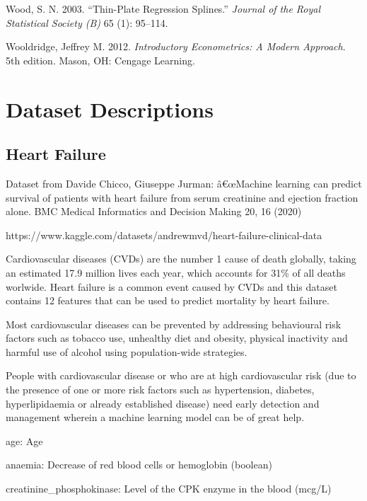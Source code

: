 \documentclass[
  letterpaper,
]{krantz}
\newlength{\cslhangindent}
\newlength{\cslentryspacingunit} %
\newenvironment{CSLReferences}[2] %
 {%
  \setlength{\parindent}{0pt}
  \ifodd #1
  \let\oldpar\par
  \def\par{\hangindent=\cslhangindent\oldpar}
  \fi
  \setlength{\parskip}{#2\cslentryspacingunit}
 }%
 {}
\begin{document}
\begin{CSLReferences}{1}{0}
\leavevmode{}%
Wood, S. N. 2003. {``Thin-Plate Regression Splines.''} \emph{Journal of
the Royal Statistical Society (B)} 65 (1): 95--114.

\leavevmode{}%
Wooldridge, Jeffrey M. 2012. \emph{Introductory {Econometrics}: {A}
{Modern} {Approach}}. 5th edition. Mason, OH: Cengage Learning.

\end{CSLReferences}

\chapter{Dataset Descriptions}\label{sec-data-descript}

\section{Heart Failure}\label{sec-dd-hear-failure}

Dataset from Davide Chicco, Giuseppe Jurman: â€œMachine learning can
predict survival of patients with heart failure from serum creatinine
and ejection fraction alone. BMC Medical Informatics and Decision Making
20, 16 (2020)

https://www.kaggle.com/datasets/andrewmvd/heart-failure-clinical-data

Cardiovascular diseases (CVDs) are the number 1 cause of death globally,
taking an estimated 17.9 million lives each year, which accounts for
31\% of all deaths worlwide. Heart failure is a common event caused by
CVDs and this dataset contains 12 features that can be used to predict
mortality by heart failure.

Most cardiovascular diseases can be prevented by addressing behavioural
risk factors such as tobacco use, unhealthy diet and obesity, physical
inactivity and harmful use of alcohol using population-wide strategies.

People with cardiovascular disease or who are at high cardiovascular
risk (due to the presence of one or more risk factors such as
hypertension, diabetes, hyperlipidaemia or already established disease)
need early detection and management wherein a machine learning model can
be of great help.

age: Age

anaemia: Decrease of red blood cells or hemoglobin (boolean)

creatinine\_phosphokinase: Level of the CPK enzyme in the blood (mcg/L)
\end{document}
